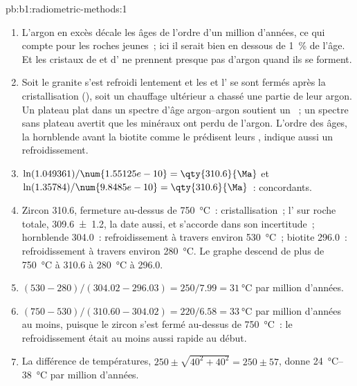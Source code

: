 \begin{solution}{pb:b1:radiometric-methods:1}
\begin{enumerate}
  \item L'argon en excès décale les âges de l'ordre d'un million d'années, ce qui
        compte pour les roches jeunes~; ici il serait bien en dessous de \qty{1}{\percent} de
        l'âge. Et les cristaux de  et d' ne prennent presque pas d'argon quand ils
        se forment.
  \item Soit le granite s'est refroidi lentement et les  et l' se sont fermés après
        la cristallisation (), soit un chauffage ultérieur a chassé une partie de leur
        argon. Un plateau plat dans un spectre d'âge argon--argon soutient un ~; un spectre sans plateau avertit que les minéraux ont perdu de l'argon.
        L'ordre des âges, la hornblende avant la biotite comme le prédisent leurs , indique aussi un refroidissement.
  \item $\ln(1.049361)/\num{1.55125e-10} = \qty{310.6}{\Ma}$ et
        $\ln(1.35784)/\num{9.8485e-10} = \qty{310.6}{\Ma}$~: concordants.
  \item Zircon \qty{310.6}{\Ma}, fermeture au-dessus de \qty{750}{\celsius}~:
        cristallisation~; l' sur roche totale,
        \qty[uncertainty-mode=separate]{309.6(12)}{\Ma}, la date aussi,
        et s'accorde dans son incertitude~; hornblende \qty{304.0}{\Ma}~: refroidissement
        à travers environ \qty{530}{\celsius}~; biotite \qty{296.0}{\Ma}~: refroidissement
        à travers environ \qty{280}{\celsius}. Le graphe descend de plus de
        \qty{750}{\celsius} à \qty{310.6}{\Ma} à \qty{280}{\celsius} à
        \qty{296.0}{\Ma}.
  \item $(530 - 280)/(304.02 - 296.03) = 250/7.99 = \qty{31}{\celsius}$ par
        million d'années.
  \item $(750 - 530)/(310.60 - 304.02) = 220/6.58 = \qty{33}{\celsius}$ par
        million d'années au moins, puisque le zircon s'est fermé au-dessus de
        \qty{750}{\celsius}~: le refroidissement était au moins aussi rapide au début.
  \item La différence de températures, $250 \pm \sqrt{40^2 + 40^2} = 250 \pm
        57$, donne \qtyrange{24}{38}{\celsius} par million d'années.

\end{enumerate}
\end{solution}
